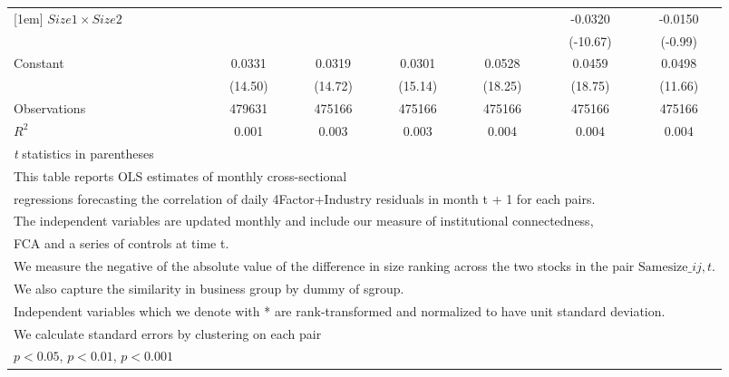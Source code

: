 {\begin{tabular}{l*{6}{c}}
[1em]
$ Size1 \times Size2 $&                     &                     &                     &                     &     -0.0320\sym{***}&     -0.0150         \\
                    &                     &                     &                     &                     &    (-10.67)         &     (-0.99)         \\
[1em]
Constant            &      0.0331\sym{***}&      0.0319\sym{***}&      0.0301\sym{***}&      0.0528\sym{***}&      0.0459\sym{***}&      0.0498\sym{***}\\
                    &     (14.50)         &     (14.72)         &     (15.14)         &     (18.25)         &     (18.75)         &     (11.66)         \\
\hline
Observations        &      479631         &      475166         &      475166         &      475166         &      475166         &      475166         \\
\(R^{2}\)           &       0.001         &       0.003         &       0.003         &       0.004         &       0.004         &       0.004         \\
\hline\hline
\multicolumn{7}{l}{\footnotesize \textit{t} statistics in parentheses}\\
\multicolumn{7}{l}{\footnotesize This table reports OLS estimates of monthly cross-sectional}\\
\multicolumn{7}{l}{\footnotesize  regressions forecasting the correlation of daily 4Factor+Industry residuals in month t + 1 for each pairs.}\\
\multicolumn{7}{l}{\footnotesize The independent variables are updated monthly and include our measure of institutional connectedness,}\\
\multicolumn{7}{l}{\footnotesize  FCA and a series of controls at time t.}\\
\multicolumn{7}{l}{\footnotesize We measure the negative of the absolute value of the difference in size ranking across the two stocks in the pair $ \text{Samesize}\_{ij,t} $.}\\
\multicolumn{7}{l}{\footnotesize We also capture the similarity in business group by dummy of sgroup.}\\
\multicolumn{7}{l}{\footnotesize Independent variables which  we denote with * are rank-transformed and normalized to have unit standard deviation.}\\
\multicolumn{7}{l}{\footnotesize  We calculate standard errors by clustering on each pair}\\
\multicolumn{7}{l}{\footnotesize \sym{*} \(p<0.05\), \sym{**} \(p<0.01\), \sym{***} \(p<0.001\)}\\
\end{tabular}
}
